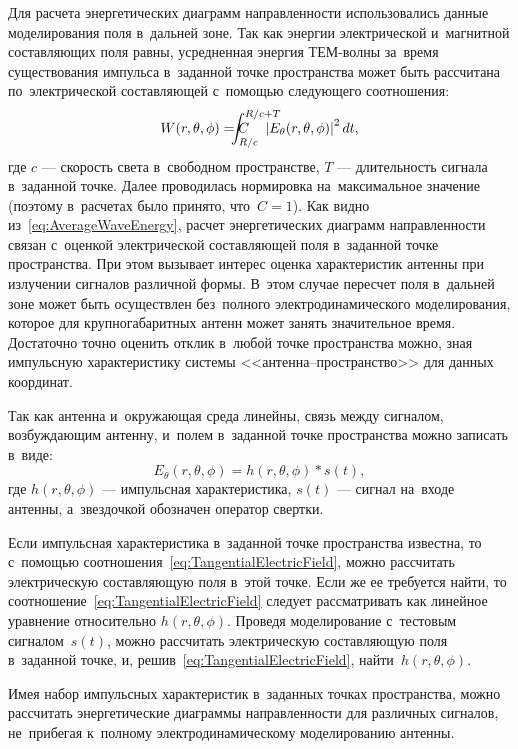 Для расчета энергетических диаграмм направленности использовались данные
моделирования поля в~дальней зоне. Так как энергии электрической и~магнитной
составляющих поля равны, усредненная энергия ТЕМ-волны за~время существования
импульса в~заданной точке пространства может быть рассчитана по~электрической
составляющей с~помощью следующего соотношения:
\begin{equation}
    \label{eq:AverageWaveEnergy}
    W(r,\theta,\phi) = C\hanglimitsoperator{\int}{R/c+T}{R/c}
    \left| E_\theta(r,\theta,\phi) \right|^2 dt,
\end{equation}
где $c$ --- скорость света в~свободном пространстве, $T$ --- длительность
сигнала в~заданной точке. Далее проводилась нормировка на~максимальное значение
(поэтому в~расчетах было принято, что~$C=1$). Как видно
из~\eqref{eq:AverageWaveEnergy}, расчет энергетических диаграмм направленности
связан с~оценкой электрической составляющей поля в~заданной точке пространства.
При этом вызывает интерес оценка характеристик антенны при излучении сигналов
различной формы. В~этом случае пересчет поля в~дальней зоне может быть
осуществлен без~полного электродинамического моделирования, которое для
крупногабаритных антенн может занять значительное время. Достаточно точно
оценить отклик в~любой точке пространства можно, зная импульсную характеристику
системы <<антенна–пространство>> для данных координат.

Так как антенна и~окружающая среда линейны, связь между сигналом, возбуждающим
антенну, и~полем в~заданной точке пространства можно записать в~виде:
\begin{equation}
    \label{eq:TangentialElectricField}
	E_\theta(r,\theta,\phi) = h(r,\theta,\phi) * s(t),
\end{equation}
где $h(r,\theta,\phi)$ --- импульсная характеристика, $s(t)$ --- сигнал на~входе
антенны, а~звездочкой обозначен оператор свертки.

Если импульсная характеристика в~заданной точке пространства известна, то
с~помощью соотношения~\eqref{eq:TangentialElectricField}, можно рассчитать
электрическую составляющую поля в~этой точке. Если же ее требуется найти, то
соотношение~\eqref{eq:TangentialElectricField} следует рассматривать как
линейное уравнение относительно $h(r,\theta,\phi)$. Проведя моделирование
с~тестовым сигналом~$s(t)$, можно рассчитать электрическую составляющую поля
в~заданной точке, и, решив~\eqref{eq:TangentialElectricField},
найти~$h(r,\theta,\phi)$.

Имея набор импульсных характеристик в~заданных точках пространства, можно
рассчитать энергетические диаграммы направленности для различных сигналов,
не~прибегая к~полному электродинамическому моделированию антенны.
